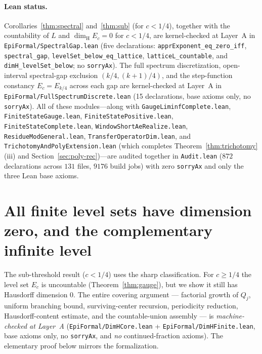 \documentclass[11pt]{article}
\theoremstyle{definition}
\theoremstyle{remark}
\newcommand{\dimH}{\dim_{\mathrm{H}}}
\begin{document}
\paragraph{Lean status.} Corollaries~\ref{thm:spectral} and~\ref{thm:sub} (for
$c<1/4$), together with the countability of $L$ and $\dimH E_c=0$ for $c<1/4$,
are kernel-checked at Layer~A in \texttt{EpiFormal/\allowbreak SpectralGap.lean}
(five declarations: \texttt{apprExponent\_eq\_zero\_iff},
\texttt{spectral\_gap}, \texttt{levelSet\_below\_eq\_lattice},
\texttt{latticeL\_countable}, and \texttt{dimH\_levelSet\_below}; no
\texttt{sorryAx}). The full spectrum discretization, open-interval spectral-gap
exclusion $(k/4,(k+1)/4)$, and the step-function constancy $E_c=E_{k/4}$ across
each gap are kernel-checked at Layer~A in
\texttt{EpiFormal/\allowbreak FullSpectrumDiscrete.lean} (15 declarations, base
axioms only, no \texttt{sorryAx}). All of these modules---along with
\texttt{Gauge\allowbreak Liminf\allowbreak Complete.lean},
\texttt{Finite\allowbreak State\allowbreak Gauge.lean},
\texttt{Finite\allowbreak State\allowbreak Positive.lean},
\texttt{Finite\allowbreak State\allowbreak Complete.lean},
\texttt{Window\allowbreak Short\allowbreak AeRealize.lean},
\texttt{Residue\allowbreak ModGeneral.lean},
\texttt{Transfer\allowbreak Operator\allowbreak Dim.lean}, and
\texttt{Trichotomy\allowbreak And\allowbreak Poly\allowbreak Extension.lean}
(which completes Theorem~\ref{thm:trichotomy}(iii) and Section~\ref{sec:poly-rec})---are
audited together in \texttt{Audit.lean} ($872$ declarations across $131$ files,
$9176$ build jobs) with zero \texttt{sorryAx} and only the three Lean base axioms.

\section{All finite level sets have dimension zero, and the complementary infinite level}\label{sec:finite-levels}

The sub-threshold result ($c<1/4$) uses the sharp classification. For
$c\ge1/4$ the level set $E_c$ is uncountable (Theorem~\ref{thm:gauge}), but we
show it still has Hausdorff dimension $0$. The entire covering argument ---
factorial growth of $Q_j$, uniform branching bound, surviving-center recursion,
periodicity reduction, Hausdorff-content estimate, and the countable-union
assembly --- is \emph{machine-checked at Layer~A}
(\texttt{EpiFormal/DimHCore.lean} + \texttt{EpiFormal/DimHFinite.lean}, base
axioms only, no \texttt{sorryAx}, and \emph{no} continued-fraction axioms).
The elementary proof below mirrors the formalization.
\end{document}

